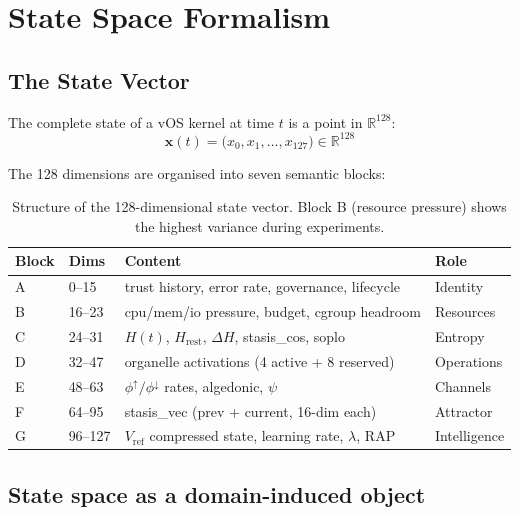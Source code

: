 \documentclass[11pt, a4paper]{article}
\newcommand{\R}{\mathbb{R}}
\newcommand{\sv}{\bm{x}}
\newcommand{\vOS}{\textsf{vOS}}
\begin{document}
\section{State Space Formalism}
\label{sec:statespace}

\subsection{The State Vector}

The complete state of a \vOS{} kernel at time $t$ is a point in $\R^{128}$:
\begin{equation}
  \sv(t) = \bigl(x_0, x_1, \ldots, x_{127}\bigr) \in \R^{128}
\end{equation}

The 128 dimensions are organised into seven semantic blocks:

\begin{table}[!htb]
\centering
\small
\begin{tabular}{llll}
\toprule
Block & Dims & Content & Role \\
\midrule
A & 0--15   & trust history, error rate, governance, lifecycle & Identity \\
B & 16--23  & cpu/mem/io pressure, budget, cgroup headroom   & Resources \\
C & 24--31  & $H(t)$, $H_\text{rest}$, $\Delta H$, stasis\_cos, soplo & Entropy \\
D & 32--47  & organelle activations (4 active + 8 reserved)  & Operations \\
E & 48--63  & $\phi^\uparrow/\phi^\downarrow$ rates, algedonic, $\psi$ & Channels \\
F & 64--95  & stasis\_vec (prev + current, 16-dim each)       & Attractor \\
G & 96--127 & $V_\text{ref}$ compressed state, learning rate, $\lambda$, RAP & Intelligence \\
\bottomrule
\end{tabular}
\caption{Structure of the 128-dimensional state vector.
Block B (resource pressure) shows the highest variance during experiments.}
\label{tab:blocks}
\end{table}

\subsection{State space as a domain-induced object}
\label{sec:domain_induced}
\end{document}
